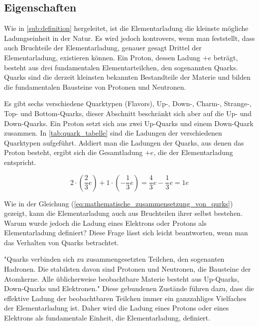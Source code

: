 \subsection{Eigenschaften}\label{sub:eigenschaften}
Wie in \autoref{sub:definition} hergeleitet, ist die Elementarladung die kleinste mögliche Ladungseinheit in der Natur. Es wird jedoch kontrovers, wenn man feststellt, dass auch Bruchteile der Elementarladung, genauer gesagt Drittel der Elementarladung, existieren können. Ein Proton, dessen Ladung $+e$ beträgt, besteht aus drei fundamentalen Elementarteilchen, den sogenannten Quarks. Quarks sind die derzeit kleinsten bekannten Bestandteile der Materie und bilden die fundamentalen Bausteine von Protonen und Neutronen.

Es gibt sechs verschiedene Quarktypen (Flavors), Up-, Down-, Charm-, Strange-, Top- und Bottom-Quarks, dieser Abschnitt beschränkt sich aber auf die Up- und Down-Quarks. Ein Proton setzt sich aus zwei Up-Quarks und einem Down-Quark zusammen. In \autoref{tab:quark_tabelle} sind die Ladungen der verschiedenen Quarktypen aufgeführt. Addiert man die Ladungen der Quarks, aus denen das Proton besteht, ergibt sich die Gesamtladung $+e$, die der Elementarladung entspricht.

\begin{equation}\label{eq:mathematische_zusammensetzung_von_qurks}
	2 \cdot \left(\frac{2}{3}e\right)  + 1 \cdot \left( -\frac{1}{3}e\right) 
	= \frac{4}{3}e - \frac{1}{3}e = 1e
\end{equation}

\noindent Wie in der Gleichung (\ref{eq:mathematische_zusammensetzung_von_qurks}) gezeigt, kann die Elementarladung auch aus Bruchteilen ihrer selbst bestehen. Warum wurde jedoch die Ladung eines Elektrons oder Protons als Elementarladung definiert? Diese Frage lässt sich leicht beantworten, wenn man das Verhalten von Quarks betrachtet.

"Quarks verbinden sich zu zusammengesetzten Teilchen, den sogenanten Hadronen. Die stabilsten davon sind Protonen und Neutronen, die Bausteine der Atomkerne. Alle üblicherweise beobachtbare Materie besteht aus Up-Quarks, Down-Quarks und Elektronen." \parencite{enwiki:1263773841} Diese gebundenen Zustände führen dazu, dass die effektive Ladung der beobachtbaren Teilchen immer ein ganzzahliges Vielfaches der Elementarladung ist. Daher wird die Ladung eines Protons oder eines Elektrons als fundamentale Einheit, die Elementarladung, definiert. 


